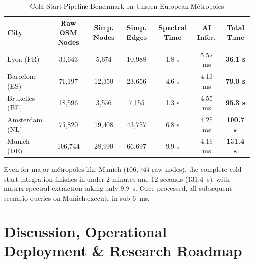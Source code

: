 \documentclass[lettersize,journal]{IEEEtran}
\begin{document}
\begin{table}[htbp]
\caption{Cold-Start Pipeline Benchmark on Unseen European Métropoles}
\label{tab:cold_start}
\centering
\begin{tabular}{lcccccc}
\toprule
City & Raw OSM Nodes & Simp. Nodes & Simp. Edges & Spectral Time & AI Infer. & Total Time \\
\midrule
Lyon (FR) & 30,643 & 5,674 & 10,988 & 1.8 s & 5.52 ms & \textbf{36.1 s} \\
Barcelone (ES) & 71,197 & 12,350 & 23,656 & 4.6 s & 4.13 ms & \textbf{79.0 s} \\
Bruxelles (BE) & 18,596 & 3,556 & 7,155 & 1.3 s & 4.55 ms & \textbf{95.3 s} \\
Amsterdam (NL) & 75,820 & 19,408 & 43,757 & 6.8 s & 4.25 ms & \textbf{100.7 s} \\
Munich (DE) & 106,744 & 28,990 & 66,697 & 9.9 s & 4.19 ms & \textbf{131.4 s} \\
\bottomrule
\end{tabular}
\end{table}

Even for major métropoles like Munich ($106,744$ raw nodes), the complete cold-start integration finishes in under $2$ minutes and $12$ seconds ($131.4$~s), with matrix spectral extraction taking only $9.9$~s. Once processed, all subsequent scenario queries on Munich execute in sub-6~ms.

\section{Discussion, Operational Deployment \& Research Roadmap}
\end{document}
